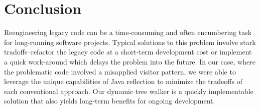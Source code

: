 \documentclass[times]{speauth}
\begin{document}




%



\section{Conclusion}

Reengineering legacy code can be a time-consuming and often encumbering task for long-running software projects. Typical solutions to this problem involve stark tradoffs--refactor the legacy code at a short-term development cost or implement a quick work-around which delays the problem into the future. In our case, where the problematic code involved a misapplied visitor pattern, we were able to leverage the unique capabilities of Java reflection to minimize the tradeoffs of each conventional approach. Our dynamic tree walker is a quickly implementable solution that also yields long-term benefits for ongoing development.
\end{document}
